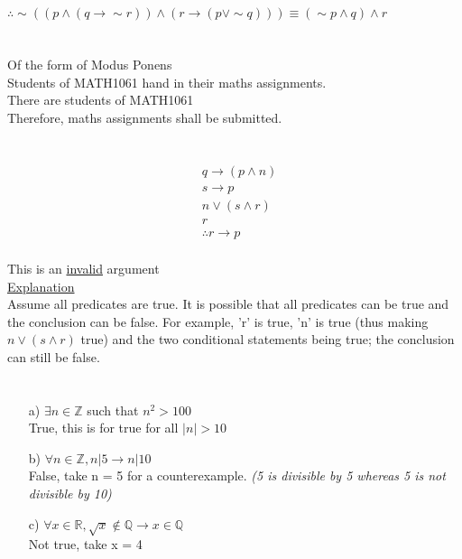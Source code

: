 \documentclass{article}
\begin{document}
$\therefore \sim (( p \wedge ( q \rightarrow \sim r )) \wedge ( r \rightarrow ( p \lor \sim q ))) \equiv ( \sim p \wedge q ) \wedge r $

\section{}
Of the form of Modus Ponens \\
Students of MATH1061 hand in their maths assignments. \\
There are students of MATH1061 \\
Therefore, maths assignments shall be submitted.

\section{}

\begin{align*}
& q \rightarrow ( p \wedge n ) \\
& s \rightarrow p \\
& n \lor ( s \wedge r ) \\
& r \\
& \therefore r \rightarrow p \\
\end{align*}

This is an \underline{invalid} argument \\

\underline{Explanation} \\
Assume all predicates are true. It is possible that all predicates can be true and the conclusion can be false.
For example, 'r' is true, 'n' is true (thus making $n \lor ( s \wedge r )$ true) and the two conditional statements being true; the conclusion
can still be false.

\section{}

\begin{enumerate}
\item[a)] $\exists n \in \mathbb{Z}$ such that $n^2 > 100$ \\
True, this is for true for all $|n| > 10$
\item[b)] $\forall n \in \mathbb{Z}, n|5 \rightarrow n|10$ \\
False, take n = 5 for a counterexample. \textit{(5 is divisible by 5 whereas 5 is not divisible by 10)}
\item[c)] $\forall  x \in \mathbb{R}, \sqrt{x} \notin \mathbb{Q} \rightarrow x \in \mathbb{Q}$ \\
Not true, take x = 4
\end{enumerate}
\end{document}
